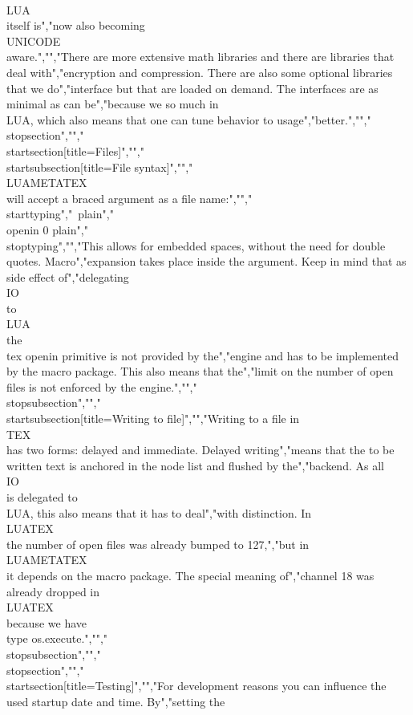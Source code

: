 \\LUA\\ itself is","now also becoming \\UNICODE\\ aware.","","There are more extensive math libraries and there are libraries that deal with","encryption and compression. There are also some optional libraries that we do","interface but that are loaded on demand. The interfaces are as minimal as can be","because we so much in \\LUA, which also means that one can tune behavior to usage","better.","","\\stopsection","","\\startsection[title={Files}]","","\\startsubsection[title={File syntax}]","","\\LUAMETATEX\\ will accept a braced argument as a file name:","","\\starttyping","\ {plain}","\\openin 0 {plain}","\\stoptyping","","This allows for embedded spaces, without the need for double quotes. Macro","expansion takes place inside the argument. Keep in mind that as side effect of","delegating \\IO\\ to \\LUA\\ the \\tex {openin} primitive is not provided by the","engine and has to be implemented by the macro package. This also means that the","limit on the number of open files is not enforced by the engine.","","\\stopsubsection","","\\startsubsection[title={Writing to file}]","","Writing to a file in \\TEX\\ has two forms: delayed and immediate. Delayed writing","means that the to be written text is anchored in the node list and flushed by the","backend. As all \\IO\\ is delegated to \\LUA, this also means that it has to deal","with distinction. In \\LUATEX\\ the number of open files was already bumped to 127,","but in \\LUAMETATEX\\ it depends on the macro package. The special meaning of","channel 18 was already dropped in \\LUATEX\\ because we have \\type {os.execute}.","","\\stopsubsection","","\\stopsection","","\\startsection[title={Testing}]","","For development reasons you can influence the used startup date and time. By","setting the 